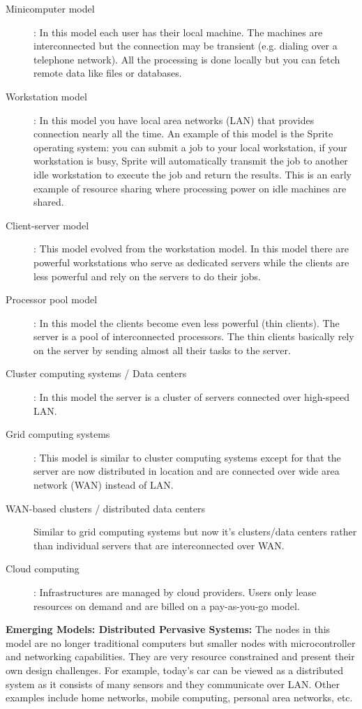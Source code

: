 \documentclass[twoside]{article}
\begin{document}
\begin{description}
  \item[Minicomputer model] : In this model each user has their local machine. The machines are interconnected but the connection may be transient (e.g. dialing over a telephone network). All the processing is done locally but you can fetch remote data like files or databases. 
  \item[Workstation model] : In this model you have local area networks (LAN) that provides connection nearly all the time. An example of this model is the Sprite operating system: you can submit a job to your local workstation, if your workstation is busy, Sprite will automatically transmit the job to another idle workstation to execute the job and return the results. This is an early example of resource sharing where processing power on idle machines are shared.
  \item[Client-server model] : This model evolved from the workstation model. In this model there are powerful workstations who serve as dedicated servers while the clients are less powerful and rely on the servers to do their jobs.
  \item[Processor pool model] : In this model the clients become even less powerful (thin clients). The server is a pool of interconnected processors. The thin clients basically rely on the server by sending almost all their tasks to the server.
  \item[Cluster computing systems / Data centers] : In this model the server is a cluster of servers connected over high-speed LAN. 
  \item[Grid computing systems] : This model is similar to cluster computing systems except for that the server are now distributed in location and are connected over wide area network (WAN) instead of LAN.
  \item[WAN-based clusters / distributed data centers] Similar to grid computing systems but now it's clusters/data centers rather than individual servers that are interconnected over WAN.
  \item[Cloud computing] : Infrastructures are managed by cloud providers. Users only lease resources on demand and are billed on a pay-as-you-go model. 
\end{description}


\textbf{Emerging Models: Distributed Pervasive Systems:} The nodes in this model are no longer traditional computers but smaller nodes with microcontroller and networking capabilities. They are very resource constrained and present their own design challenges. For example, today's car can be viewed as a distributed system as it consists of many sensors and they communicate over LAN. Other examples include home networks, mobile computing, personal area networks, etc.
\end{document}
